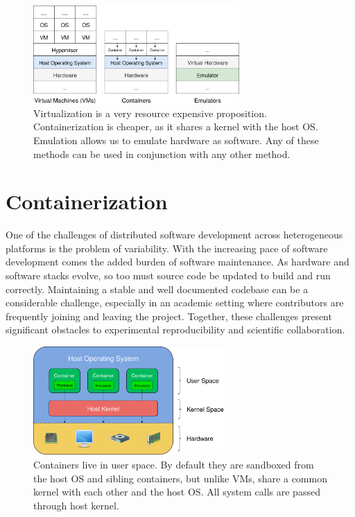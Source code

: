 \documentclass[12pt,initial,twoside,maitrise]{dms}
\numberwithin{equation}{section}
\numberwithin{table}{chapter}
\numberwithin{figure}{chapter}
\begin{document}
\begin{figure}
    \centering
    \includegraphics[width=0.70\textwidth]{vms_containers_emulators.png}
    \caption{Virtualization is a very resource expensive proposition. Containerization is cheaper, as it shares a kernel with the host OS. Emulation allows us to emulate hardware as software. Any of these methods can be used in conjunction with any other method.\vspace{-10}}
    \label{fig:vms_containers_emulators}
\end{figure}

\section{Containerization}\label{sec:containerization}

One of the challenges of distributed software development across heterogeneous platforms is the problem of variability. With the increasing pace of software development comes the added burden of software maintenance. As hardware and software stacks evolve, so too must source code be updated to build and run correctly. Maintaining a stable and well documented codebase can be a considerable challenge, especially in an academic setting where contributors are frequently joining and leaving the project. Together, these challenges present significant obstacles to experimental reproducibility and scientific collaboration.


\begin{figure}[ht]
    \centering
    \includegraphics[width=0.65\textwidth]{user_kernel_hardware.png}
    \caption{Containers live in user space. By default they are sandboxed from the host OS and sibling containers, but unlike VMs, share a common kernel with each other and the host OS. All system calls are passed through host kernel.}
    \label{fig:user_kernel_hardware}
\end{figure}
\end{document}
